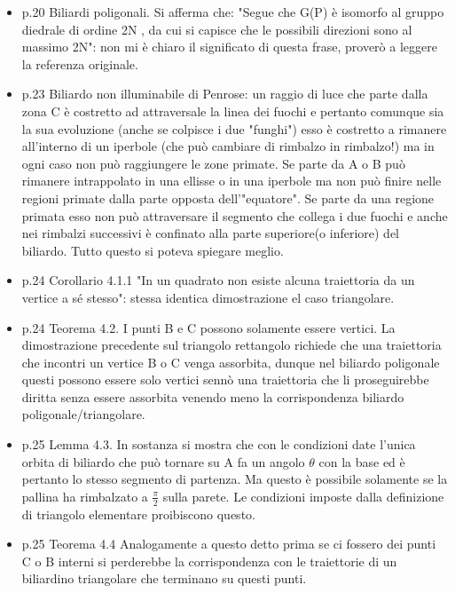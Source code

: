 \documentclass[10pt,a4paper]{article}
\begin{document}
\begin{itemize}
\item p.20 Biliardi poligonali. Si afferma che: "Segue che G(P) è isomorfo al gruppo diedrale di ordine 2N , da cui si capisce che le
possibili direzioni sono al massimo 2N": non mi è chiaro il significato di questa frase, proverò a leggere la referenza originale.

\item p.23 Biliardo non illuminabile di Penrose: un raggio di luce che parte dalla zona C è costretto ad attraversale la linea dei fuochi e pertanto comunque sia la sua evoluzione (anche se colpisce i due "funghi") esso è costretto a rimanere all'interno di un iperbole (che può cambiare di rimbalzo in rimbalzo!) ma in ogni caso non può raggiungere le zone primate. Se parte da A o B può rimanere intrappolato in una ellisse o in una iperbole ma non può finire nelle regioni primate dalla parte opposta dell'"equatore". Se parte da una regione primata esso non può attraversare il segmento che collega i due fuochi e anche nei rimbalzi successivi è confinato alla parte superiore(o inferiore) del biliardo. Tutto questo si poteva spiegare meglio.

\item p.24 Corollario 4.1.1 "In un quadrato non esiste alcuna traiettoria da un vertice a sé stesso": stessa identica dimostrazione el caso triangolare.

\item p.24 Teorema 4.2. I punti B e C possono solamente essere vertici. La dimostrazione precedente sul triangolo rettangolo richiede che una traiettoria che incontri un vertice B o C venga assorbita, dunque nel biliardo poligonale questi possono essere solo vertici sennò una traiettoria che li proseguirebbe diritta senza essere assorbita venendo meno la corrispondenza biliardo poligonale/triangolare.

\item p.25 Lemma 4.3. In sostanza si mostra che con le condizioni date  l'unica orbita di biliardo che può tornare su A fa un angolo $\theta$ con la base ed è pertanto lo stesso segmento di partenza. Ma questo è possibile solamente se la pallina ha rimbalzato a $\frac{\pi}{2}$ sulla parete. Le condizioni imposte dalla definizione di triangolo elementare proibiscono questo.

\item p.25 Teorema 4.4 Analogamente a questo detto prima se ci fossero dei punti C o B interni si perderebbe la corrispondenza con le traiettorie di un biliardino triangolare che terminano su questi punti.

\end{itemize}
\end{document}
